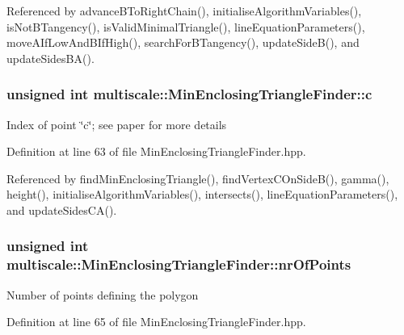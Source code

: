 Referenced by advance\-B\-To\-Right\-Chain(), initialise\-Algorithm\-Variables(), is\-Not\-B\-Tangency(), is\-Valid\-Minimal\-Triangle(), line\-Equation\-Parameters(), move\-A\-If\-Low\-And\-B\-If\-High(), search\-For\-B\-Tangency(), update\-Side\-B(), and update\-Sides\-B\-A().

\hypertarget{classmultiscale_1_1MinEnclosingTriangleFinder_a758f39b2d0cf35337f28d8ed871c2c0b}{
\subsubsection[{c}]{\setlength{\rightskip}{0pt plus 5cm}unsigned int multiscale\-::\-Min\-Enclosing\-Triangle\-Finder\-::c\hspace{0.3cm}{\ttfamily [private]}}}\label{classmultiscale_1_1MinEnclosingTriangleFinder_a758f39b2d0cf35337f28d8ed871c2c0b}
Index of point \char`\"{}c\char`\"{}; see paper for more details 

Definition at line 63 of file Min\-Enclosing\-Triangle\-Finder.\-hpp.



Referenced by find\-Min\-Enclosing\-Triangle(), find\-Vertex\-C\-On\-Side\-B(), gamma(), height(), initialise\-Algorithm\-Variables(), intersects(), line\-Equation\-Parameters(), and update\-Sides\-C\-A().

\hypertarget{classmultiscale_1_1MinEnclosingTriangleFinder_a92409868a6731f5e41878085f3ac0f73}{
\subsubsection[{nr\-Of\-Points}]{\setlength{\rightskip}{0pt plus 5cm}unsigned int multiscale\-::\-Min\-Enclosing\-Triangle\-Finder\-::nr\-Of\-Points\hspace{0.3cm}{\ttfamily [private]}}}\label{classmultiscale_1_1MinEnclosingTriangleFinder_a92409868a6731f5e41878085f3ac0f73}
Number of points defining the polygon 

Definition at line 65 of file Min\-Enclosing\-Triangle\-Finder.\-hpp.



